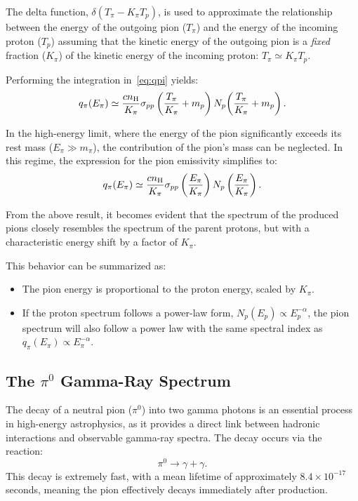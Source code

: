 
The delta function, \(\delta(T_\pi - K_\pi T_p)\), is used to approximate the relationship between the energy of the outgoing pion (\(T_\pi\)) and the energy of the incoming proton (\(T_p\)) assuming that the kinetic energy of the outgoing pion is a \emph{fixed} fraction (\(K_\pi\)) of the kinetic energy of the incoming proton:
\( T_\pi \simeq K_\pi T_p \).

Performing the integration in~\cref{eq:qpi} yields:
%
\begin{equation}
q_\pi (E_\pi) \simeq \frac{c n_{\rm H}}{K_\pi} \sigma_{pp} \left(\frac{T_\pi}{K_\pi} + m_p \right) N_p \! \left(\frac{T_\pi}{K_\pi} + m_p \right).
\end{equation}

In the high-energy limit, where the energy of the pion significantly exceeds its rest mass (\(E_\pi \gg m_\pi\)), the contribution of the pion’s mass can be neglected. In this regime, the expression for the pion emissivity simplifies to:
%
\begin{equation}
q_\pi (E_\pi) \simeq \frac{c n_{\rm H}}{K_\pi} \sigma_{pp} \left( \frac{E_\pi}{K_\pi} \right) N_p \left( \frac{E_\pi}{K_\pi} \right).
\end{equation}

From the above result, it becomes evident that the spectrum of the produced pions closely resembles the spectrum of the parent protons, but with a characteristic energy shift by a factor of \(K_\pi\).  

This behavior can be summarized as:
%
\begin{itemize}
\item The pion energy is proportional to the proton energy, scaled by \(K_\pi\).  
\item If the proton spectrum follows a power-law form, \(N_p(E_p) \propto E_p^{-\alpha}\), the pion spectrum will also follow a power law with the same spectral index as \( q_\pi(E_\pi) \propto E_\pi^{-\alpha} \).
\end{itemize}

\subsection{The \(\pi^0\) Gamma-Ray Spectrum }

The decay of a neutral pion (\(\pi^0\)) into two gamma photons is an essential process in high-energy astrophysics, as it provides a direct link between hadronic interactions and observable gamma-ray spectra. The decay occurs via the reaction:  
\begin{equation}
\pi^0 \rightarrow \gamma + \gamma.
\end{equation}  
This decay is extremely fast, with a mean lifetime of approximately \(8.4 \times 10^{-17}\) seconds, meaning the pion effectively decays immediately after production.  

